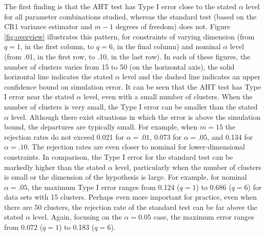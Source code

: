 \documentclass[12pt]{article}\usepackage[]{graphicx}\usepackage[]{color}
\begin{document}
The first finding is that the AHT test has Type I error close to the stated $\alpha$ level for all parameter combinations studied, whereas the standard test (based on the CR1 variance estimator and $m - 1$ degrees of freedom) does not. 
Figure \ref{fig:overview} illustrates this pattern, for constraints of varying dimension (from $q = 1$, in the first column, to $q = 6$, in the final column) and nominal $\alpha$ level (from .01, in the first row, to .10, in the last row). 
In each of these figures, the number of clusters varies from 15 to 50 (on the horizontal axis), the solid horizontal line indicates the stated $\alpha$ level and the dashed line indicates an upper confidence bound on simulation error.
It can be seen that the AHT test has Type I error near the stated $\alpha$ level, even with a small number of clusters.
When the number of clusters is very small, the Type I error can be smaller than the stated $\alpha$ level. 
Although there exist situations in which the error is above the simulation bound, the departures are typically small. For example, when $m = 15$ the rejection rates do not exceed 0.021 for $\alpha = .01$, 0.073 for $\alpha = .05$, and 0.134 for $\alpha = .10$.
The rejection rates are even closer to nominal for lower-dimensional constraints.
In comparison, the Type I error for the standard test can be markedly higher than the stated $\alpha$ level, particularly when the number of clusters is small or the dimension of the hypothesis is large. 
For example, for nominal $\alpha = .05$, the maximum Type I error ranges from 0.124 ($q = 1$) to 0.686 ($q = 6$) for data sets with 15 clusters.
Perhaps even more important for practice, even when there are 50 clusters, the rejection rate of the standard test can be far above the stated $\alpha$ level.
Again, focusing on the $\alpha = 0.05$ case, the maximum error ranges from 0.072 ($q = 1$) to 0.183 ($q = 6$).
\end{document}
